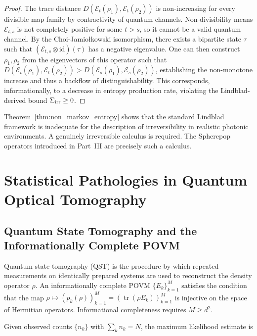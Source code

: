 \documentclass[11pt, openright, twoside]{book}
\theoremstyle{plain}
\theoremstyle{definition}
\theoremstyle{remark}
\begin{document}
\begin{proof}
The trace distance $D(\mathcal{E}_t(\rho_1), \mathcal{E}_t(\rho_2))$ is non-increasing for
every divisible map family by contractivity of quantum channels. Non-divisibility means
$\mathcal{E}_{t,s}$ is not completely positive for some $t > s$, so it cannot be a valid
quantum channel. By the Choi-Jamio\l{}kowski isomorphism, there exists a bipartite state
$\tau$ such that $(\mathcal{E}_{t,s} \otimes \mathrm{id})(\tau)$ has a negative eigenvalue.
One can then construct $\rho_1, \rho_2$ from the eigenvectors of this operator such that
$D(\mathcal{E}_t(\rho_1), \mathcal{E}_t(\rho_2)) > D(\mathcal{E}_s(\rho_1), \mathcal{E}_s(\rho_2))$,
establishing the non-monotone increase and thus a backflow of distinguishability. This
corresponds, informationally, to a decrease in entropy production rate, violating the
Lindblad-derived bound $\Sigma_{\rm irr} \geq 0$.
\end{proof}

Theorem~\ref{thm:non_markov_entropy} shows that the standard Lindblad framework is inadequate
for the description of irreversibility in realistic photonic environments. A genuinely
irreversible calculus is required. The Spherepop operators introduced in Part~III are
precisely such a calculus.

\chapter{Statistical Pathologies in Quantum Optical Tomography}

\section{Quantum State Tomography and the Informationally Complete POVM}

Quantum state tomography (QST) is the procedure by which repeated measurements on identically
prepared systems are used to reconstruct the density operator $\rho$. An informationally
complete POVM $\{E_k\}_{k=1}^{M}$ satisfies the condition that the map
$\rho \mapsto (p_k(\rho))_{k=1}^M = (\operatorname{tr}(\rho E_k))_{k=1}^M$
is injective on the space of Hermitian operators. Informational completeness requires $M \geq d^2$.

Given observed counts $\{n_k\}$ with $\sum_k n_k = N$, the maximum likelihood estimate is
\end{document}
